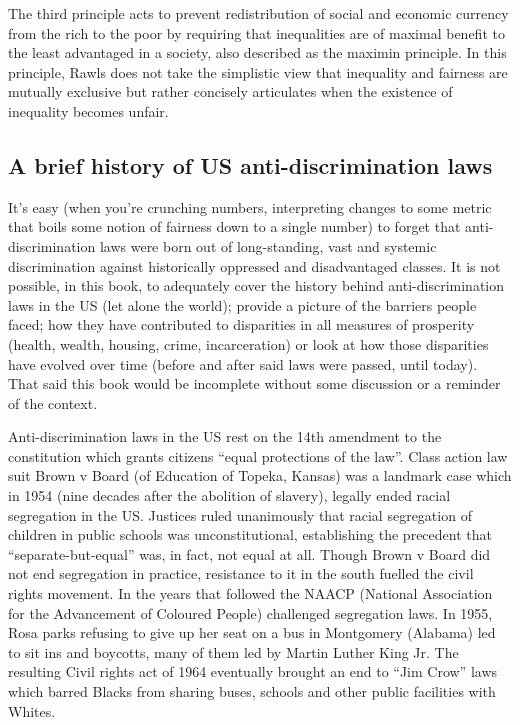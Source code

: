 The third principle acts to prevent redistribution of social and economic currency from the rich to the poor by requiring that inequalities are of maximal benefit to the least advantaged in a society, also described as the maximin principle. In this principle, Rawls does not take the simplistic view that inequality and fairness are mutually exclusive but rather concisely articulates when the existence of inequality becomes unfair.

\subsection{A brief history of US anti-discrimination laws}

It's easy (when you're crunching numbers, interpreting changes to some metric that boils some notion of fairness down to a single number) to forget that anti-discrimination laws were born out of long-standing, vast and systemic discrimination against historically oppressed and disadvantaged classes. It is not possible, in this book, to adequately cover the history behind anti-discrimination laws in the US (let alone the world); provide a picture of the barriers people faced; how they have contributed to disparities in all measures of prosperity (health, wealth, housing, crime, incarceration) or look at how those disparities have evolved over time (before and after said laws were passed, until today). That said this book would be incomplete without some discussion or a reminder of the context.

Anti-discrimination laws in the US rest on the 14th amendment to the constitution which grants citizens ``equal protections of the law''. Class action law suit Brown v Board (of Education of Topeka, Kansas) was a landmark case which in 1954 (nine decades after the abolition of slavery), legally ended racial segregation in the US. Justices ruled unanimously that racial segregation of children in public schools was unconstitutional, establishing the precedent that ``separate-but-equal'' was, in fact, not equal at all. Though Brown v Board did not end segregation in practice, resistance to it in the south fuelled the civil rights movement. In the years that followed the NAACP (National Association for the Advancement of Coloured People) challenged segregation laws. In 1955, Rosa parks refusing to give up her seat on a bus in Montgomery (Alabama) led to sit ins and boycotts, many of them led by Martin Luther King Jr. The resulting Civil rights act of 1964 eventually brought an end to ``Jim Crow'' laws which barred Blacks from sharing buses, schools and other public facilities with Whites.

